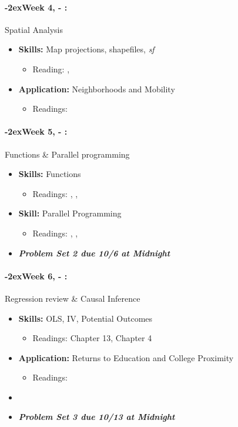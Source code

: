 \documentclass[11pt]{article}
\newcommand{\week}[1]{%
  \paragraph*{\kern-2ex\quad #1, \AdvanceDate[1]\syldate{\today} - \AdvanceDate[2]\syldate{\today}:}%
  \ifdim\wd1=\wd\MONDAY
    \AdvanceDate[7]
  \else
    \AdvanceDate[7]
  \fi%
}
\begin{document}
\week{Week 4} Spatial Analysis
\begin{itemize}
  \item \textbf{Skills:} Map projections, shapefiles, \textit{sf}
  \begin{itemize}
    \item Reading: \textbf{\cite{mcdermott2023spatial}} \cite{crs}, \cite{lovelace2019geographic}
  \end{itemize}
  \item \textbf{Application:} Neighborhoods and Mobility
  \begin{itemize}
    \item Readings: \textbf{\cite{chetty2018opportunityatlas}}
  \end{itemize}
\end{itemize}
\week{Week 5} Functions \& Parallel programming
\begin{itemize}
  \item \textbf{Skills:} Functions
  \begin{itemize}
    \item Readings: \cite{mcdermott2023functionsintro}, \cite{mcdermott2023functionsadvanced} \cite{wickham2023meta}, \cite{tidyeval}
  \end{itemize}
  \item \textbf{Skill:} Parallel Programming
  \begin{itemize}
    \item Readings: \textbf{\cite{mcdermott2023parallel}}, \cite{eddelbuettel2020parallel}, \cite{mcdermott2023parallel}
  \end{itemize}
  \item \textit{\textbf{Problem Set 2 due 10/6 at Midnight}}
\end{itemize}
\week{Week 6} Regression review \& Causal Inference
\begin{itemize}
  \item \textbf{Skills:} OLS, IV, Potential Outcomes
  \begin{itemize}
    \item Readings: \cite{hungtintonklein2023effect} Chapter 13, \cite{cunningham2023mixtape} Chapter 4
  \end{itemize}
  \item \textbf{Application:} Returns to Education and College Proximity
  \begin{itemize}
    \item Readings: \textbf{\cite{card1993college}}
  \end{itemize}
  \item \item \textit{\textbf{Problem Set 3 due 10/13 at Midnight}}
\end{itemize}
\end{document}
